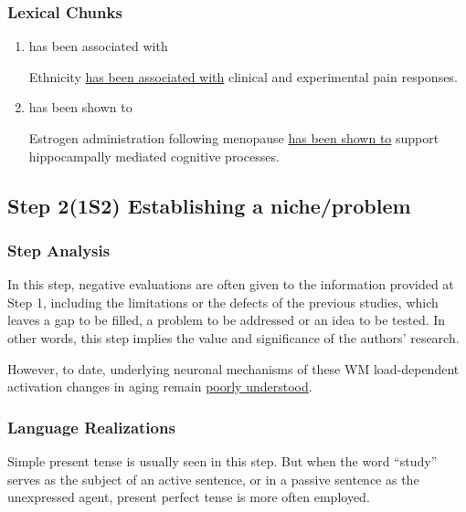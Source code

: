 \documentclass{ctexbook}
\begin{document}
    \subsubsection{Lexical Chunks}

    \begin{enumerate}
      \item has been associated with
      \begin{eg}[label={myautocounter}]{}
        Ethnicity \uline{has been associated with} clinical and experimental pain responses.
      \end{eg}

      \item has been shown to
      \begin{eg}[label={myautocounter}]{}
        Estrogen administration following menopause \uline{has been shown to} support hippocampally mediated cognitive processes.
      \end{eg}
    \end{enumerate}
  
  \subsection{Step 2(1S2) Establishing a niche/problem}

    \subsubsection{Step Analysis}

    In this step, negative evaluations are often given to the information provided at Step 1, including the limitations or the defects of the previous studies, which leaves a gap to be filled, a problem to be addressed or an idea to be tested. In other words, this step implies the value and significance of the authors' research.

    \begin{eg}{}
      However, to date, underlying neuronal mechanisms of these WM load-dependent activation changes in aging remain \uline{poorly understood}.
    \end{eg}

    \subsubsection{Language Realizations}

    Simple present tense is usually seen in this step. But when the word ``study'' serves as the subject of an active sentence, or in a passive sentence as the unexpressed agent, present perfect tense is more often employed.
\end{document}
